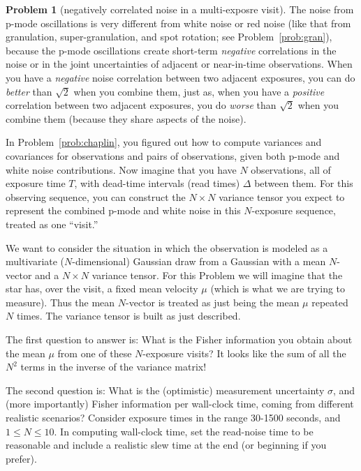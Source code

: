 \documentclass{article}
\theoremstyle{definition}
\newcommand{\problemname}{Problem}
\newtheorem{problem}{\problemname}
\newcommand{\probref}[1]{\problemname~\ref{#1}}
\theoremstyle{remark}
\begin{document}
\begin{problem}[negatively correlated noise in a multi-exposre visit]\label{prob:negative}
The noise from p-mode oscillations is very different from white noise or red noise (like that from granulation, super-granulation, and spot rotation; see \probref{prob:gran}), because the p-mode oscillations create short-term \emph{negative} correlations in the noise or in the joint uncertainties of adjacent or near-in-time observations.
When you have a \emph{negative} noise correlation between two adjacent exposures, you can do \emph{better} than $\sqrt{2}$ when you combine them, just as, when you have a \emph{positive} correlation between two adjacent exposures, you do \emph{worse} than $\sqrt{2}$ when you combine them (because they share aspects of the noise).

In \probref{prob:chaplin}, you figured out how to compute variances and covariances for observations and pairs of observations, given both p-mode and white noise contributions.
Now imagine that you have $N$ observations, all of exposure time $T$, with dead-time intervals (read times) $\Delta$ between them.
For this observing sequence, you can construct the $N\times N$ variance tensor you expect to represent the combined p-mode and white noise in this $N$-exposure sequence, treated as one ``visit.''

We want to consider the situation in which the observation is modeled as a multivariate ($N$-dimensional) Gaussian draw from a Gaussian with a mean $N$-vector and a $N\times N$ variance tensor.
For this \problemname{} we will imagine that the star has, over the visit, a fixed mean velocity $\mu$ (which is what we are trying to measure).
Thus the mean $N$-vector is treated as just being the mean $\mu$ repeated $N$ times.
The variance tensor is built as just described.

The first question to answer is: What is the Fisher information you obtain about the mean $\mu$ from one of these $N$-exposure visits?
It looks like the sum of all the $N^2$ terms in the inverse of the variance matrix!

The second question is: What is the (optimistic) measurement uncertainty $\sigma$, and (more importantly) Fisher information per wall-clock time, coming from different realistic scenarios?
Consider exposure times in the range 30-1500 seconds, and $1\leq N\leq 10$.
In computing wall-clock time, set the read-noise time to be reasonable and include a realistic slew time at the end (or beginning if you prefer).
\end{problem}
\end{document}

